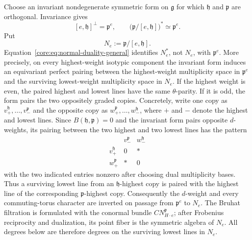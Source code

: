 \documentclass[11pt,reqno]{amsart}
\numberwithin{equation}{section}
\theoremstyle{definition}
\theoremstyle{remark}
\newcommand{\fg}{\mathfrak g}
\newcommand{\fh}{\mathfrak h}
\newcommand{\fp}{\mathfrak p}
\begin{document}
Choose an invariant nondegenerate symmetric form on $\fg$ for which $\fh$ and
$\fp$ are orthogonal.  Invariance gives
\begin{equation}\label{core:eq:normal-duality-general}
 [e,\fh]^\perp=\fp^e,
 \qquad
 \bigl(\fp/[e,\fh]\bigr)^*\simeq\fp^e.
\end{equation}
Put
\[
 N_e:=\fp/[e,\fh].
\]
Equation~\eqref{core:eq:normal-duality-general} identifies $N_e^*$, not
$N_e$, with $\fp^e$.  More precisely, on every highest-weight isotypic component the invariant
form induces an equivariant perfect pairing between the highest-weight
multiplicity space in $\fp^e$ and the surviving lowest-weight multiplicity
space in $N_e$.  If the highest weight is even, the paired highest and lowest
lines have the same $\theta$-parity.  If it is odd, the form pairs the two
oppositely graded copies.  Concretely, write one copy as
$v_+^{\fh},\ldots,v_-^{\fp}$ and the opposite copy as
$w_+^{\fp},\ldots,w_-^{\fh}$, where $+$ and $-$ denote the highest and
lowest lines.  Since $B(\fh,\fp)=0$ and the invariant form pairs opposite
$d$-weights, its pairing between the two highest and two lowest lines has
the pattern
\[
\begin{array}{c|cc}
 & v_-^{\fp} & w_-^{\fh}\\ \hline
 v_+^{\fh} & 0 & *\\
 w_+^{\fp} & * & 0
\end{array}
\]
with the two indicated entries nonzero after choosing dual multiplicity
bases.  Thus a surviving lowest line from an $\fh$-highest copy is paired
with the highest line of the corresponding $\fp$-highest copy.
Consequently the $d$-weight and every commuting-torus
character are inverted
on passage from $\fp^e$ to $N_e$.  The Bruhat filtration is formulated with the conormal
bundle $CN_{H\cdot e}^{\fp}$; after Frobenius reciprocity and dualization,
its point fiber is the symmetric algebra of $N_e$.  All degrees below are
therefore degrees on the surviving lowest lines in $N_e$.
\end{document}
